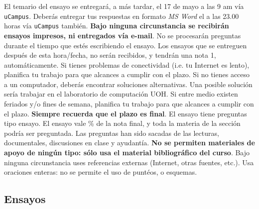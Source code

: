 \documentclass{article}
\begin{document}
El temario del ensayo se entregar\'a, a m\'as tardar, el 17 de mayo a las 9 am v\'ia \texttt{uCampus}. Deber\'as entregar tus respuestas en formato \emph{MS Word} el \underline{{\unskip}} a las 23.00 horas v\'ia \texttt{uCampus} tambi\'en. {\bf Bajo ninguna circunstancia se recibir\'an ensayos impresos, ni entregados v\'ia e-mail}. No se procesar\'an preguntas durante el tiempo que est\'es escribiendo el ensayo. Los ensayos que se entreguen despu\'es de esta hora/fecha, no ser\'an recibidos, y tendr\'an una nota 1, autom\'aticamente. Si tienes problemas de conectividad (i.e. tu Internet es lento), planifica tu trabajo para que alcances a cumplir con el plazo. Si no tienes acceso a un computador, deber\'as encontrar soluciones alternativas. Una posible soluci\'on ser\'ia trabajar en el laboratorio de computaci\'on UOH. Si entre medio existen feriados y/o fines de semana, planifica tu trabajo para que alcances a cumplir con el plazo. {\bf Siempre recuerda que el plazo es final}. El ensayo tiene {\unskip} preguntas tipo ensayo. El ensayo vale {\unskip}\% de la nota final, y toda la materia de la secci\'on podr\'ia ser preguntada. Las preguntas han sido sacadas de las lecturas, documentales, discusiones en clase y ayudant\'ia. {\bf No se permiten materiales de apoyo de ning\'un tipo: s\'olo usa el material bibliogr\'afico del curso}. Bajo ninguna circunstancia uses referencias externas (Internet, otras fuentes, etc.). Usa oraciones enteras: no se permite el uso de punt\'eos, o esquemas. 


 

\subsection*{Ensayos}
\end{document}
